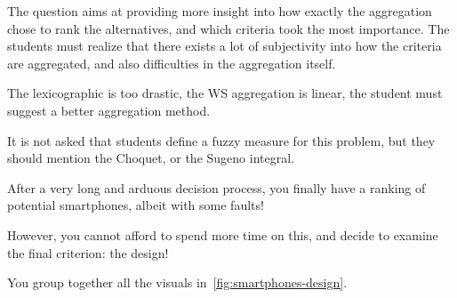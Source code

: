 \documentclass[answers, 10pt, UKenglish]{exam}
\begin{document}
\begin{questions}
	\begin{solutionorbox}
	{
		\color{red}
		
		The question aims at providing more insight into how exactly
		the aggregation chose to rank the alternatives, and which
		criteria took the most importance. The students must realize
		that there exists a lot of subjectivity into how the criteria
		are aggregated, and also difficulties in the aggregation
		itself. 

		The lexicographic is too drastic, the WS aggregation is linear,
		the student must suggest a better aggregation method.

		It is not asked that students define a fuzzy measure for this
		problem, but they should mention the Choquet, or the Sugeno
		integral.

	}
	\end{solutionorbox}
	
	\question\label{q:6}%
	After a very long and arduous decision process, you finally have a
	ranking of potential smartphones, albeit with some faults! 

	However, you cannot afford to spend more time on this, and decide to
	examine the final criterion: the design!

	You group together all the visuals in~\cref{fig:smartphones-design}.


\end{questions}
\end{document}

